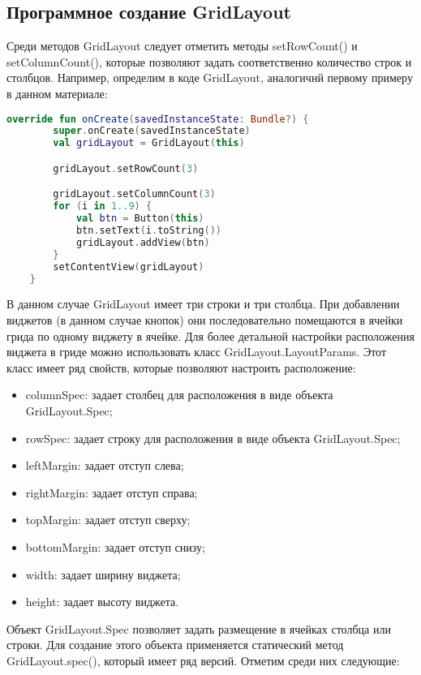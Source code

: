\subsection{Программное создание GridLayout}
Среди методов GridLayout следует отметить методы setRowCount() и
setColumnCount(), которые позволяют задать соответственно количество
строк и столбцов. Например, определим в коде GridLayout, аналогичнй
первому примеру в данном материале:
\begin{lstlisting}[language=Kotlin, caption=\leftline{Kotlin}, label=lst:Программное создание GridLayout]
override fun onCreate(savedInstanceState: Bundle?) {
        super.onCreate(savedInstanceState)
        val gridLayout = GridLayout(this)

        gridLayout.setRowCount(3)

        gridLayout.setColumnCount(3)
        for (i in 1..9) {
            val btn = Button(this)
            btn.setText(i.toString())
            gridLayout.addView(btn)
        }
        setContentView(gridLayout)
    }
\end{lstlisting}
В данном случае GridLayout имеет три строки и три столбца. При добавлении
виджетов (в данном случае кнопок) они последовательно помещаются в
ячейки грида по одному виджету в ячейке.
Для более детальной настройки расположения виджета в гриде можно
использовать класс GridLayout.LayoutParams. Этот класс имеет ряд
свойств, которые позволяют настроить расположение:
\begin{itemize}
    \item columnSpec: задает столбец для расположения в виде объекта
    GridLayout.Spec;
    \item rowSpec: задает строку для расположения в виде объекта
    GridLayout.Spec;
    \item leftMargin: задает отступ слева;
    \item rightMargin: задает отступ справа;
    \item topMargin: задает отступ сверху;
    \item bottomMargin: задает отступ снизу;
    \item width: задает ширину виджета;
    \item height: задает высоту виджета.
\end{itemize}
Объект GridLayout.Spec позволяет задать размещение в ячейках столбца или
строки. Для создание этого объекта применяется статический метод
GridLayout.spec(), который имеет ряд версий. Отметим среди них следующие:
